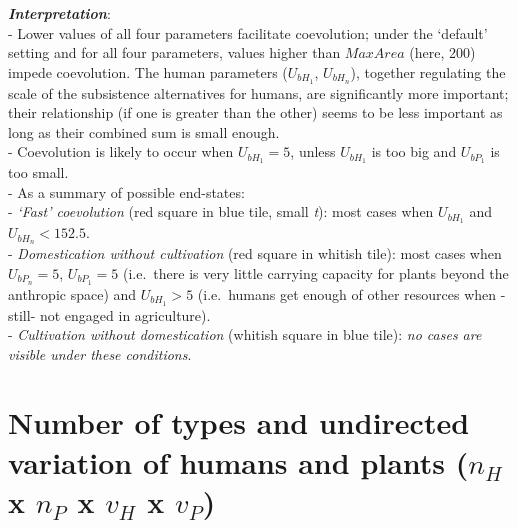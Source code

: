 \documentclass[]{book}
\begin{document}
\textbf{\emph{Interpretation}}:\\
- Lower values of all four parameters facilitate coevolution; under the `default' setting and for all four parameters, values higher than \(MaxArea\) (here, 200) impede coevolution. The human parameters (\(U_{bH_{1}}\), \(U_{bH_{n}}\)), together regulating the scale of the subsistence alternatives for humans, are significantly more important; their relationship (if one is greater than the other) seems to be less important as long as their combined sum is small enough.\\
- Coevolution is likely to occur when \(U_{bH_{1}}=5\), unless \(U_{bH_{1}}\) is too big and \(U_{bP_{1}}\) is too small.\\
- As a summary of possible end-states:\\
- \emph{`Fast' coevolution} (red square in blue tile, small \emph{t}): most cases when \(U_{bH_{1}}\) and \(U_{bH_{n}}<152.5\).\\
- \emph{Domestication without cultivation} (red square in whitish tile): most cases when \(U_{bP_{n}}=5\), \(U_{bP_{1}}=5\) (i.e.~there is very little carrying capacity for plants beyond the anthropic space) and \(U_{bH_{1}}>5\) (i.e.~humans get enough of other resources when -still- not engaged in agriculture).\\
- \emph{Cultivation without domestication} (whitish square in blue tile): \emph{no cases are visible under these conditions}.

\newpage

\hypertarget{number-of-types-and-undirected-variation-of-humans-and-plants-n_h-x-n_p-x-v_h-x-v_p}{%
\section{\texorpdfstring{Number of types and undirected variation of humans and plants (\(n_{H}\) x \(n_{P}\) x \(v_{H}\) x \(v_{P}\))}{Number of types and undirected variation of humans and plants (n\_\{H\} x n\_\{P\} x v\_\{H\} x v\_\{P\})}}\label{number-of-types-and-undirected-variation-of-humans-and-plants-n_h-x-n_p-x-v_h-x-v_p}}
\end{document}
